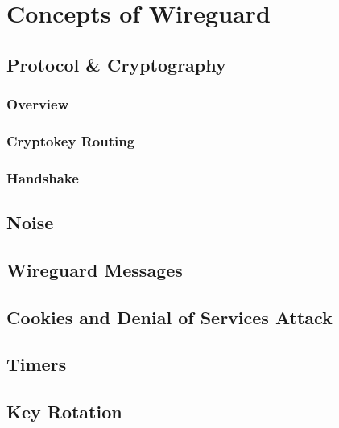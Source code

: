 \chapter{Concepts of Wireguard}
\section{Protocol \& Cryptography}
\subsection{Overview}
\subsection{Cryptokey Routing}
\subsection{Handshake}
\section{Noise}
\section{Wireguard Messages}
\section{Cookies and Denial of Services Attack}
\section{Timers}
\section{Key Rotation}